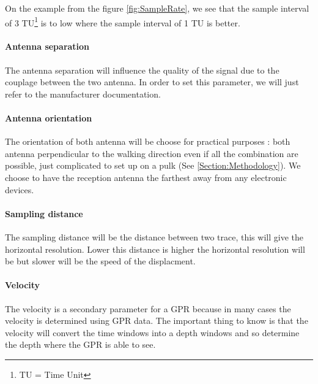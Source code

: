 On the example from the figure \ref{fig:SampleRate}, we see that the sample interval of 3 TU\footnote{TU = Time Unit} is to low where the sample interval of 1 TU is better.

\paragraph{Antenna separation} The antenna separation will influence the quality of the signal due to the couplage between the two antenna. In order to set this parameter, we will just refer to the manufacturer documentation.

\paragraph{Antenna orientation} The orientation of both antenna will be choose for practical purposes : both antenna perpendicular to the walking direction even if all the combination are possible, just complicated to set up on a pulk (See \ref{Section:Methodology}). We choose to have the reception antenna the farthest away from any electronic devices.


\paragraph{Sampling distance} The sampling distance will be the distance between two trace, this will give the horizontal resolution. Lower this distance is higher the horizontal resolution will be but slower will be the speed of the displacment.

\paragraph{Velocity} The velocity is a secondary parameter for a GPR because in many cases the velocity is determined using GPR data. The important thing to know is that the velocity will convert the time windows into a depth windows and so determine the depth where the GPR is able to see.


